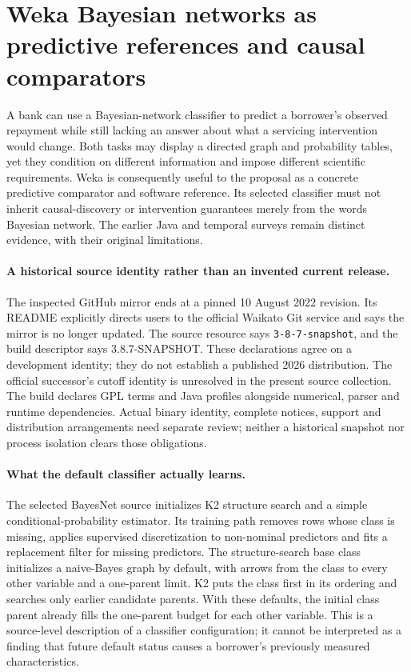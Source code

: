 \section{Weka Bayesian networks as predictive references and causal comparators}
\label{sec:exec24-weka-reuse}

A bank can use a Bayesian-network classifier to predict a borrower's observed
repayment while still lacking an answer about what a servicing intervention
would change. Both tasks may display a directed graph and probability tables,
yet they condition on different information and impose different scientific
requirements. Weka is consequently useful to the proposal as a concrete
predictive comparator and software reference. Its selected classifier must not
inherit causal-discovery or intervention guarantees merely from the words
Bayesian network. The earlier Java and temporal surveys remain distinct
evidence, with their original limitations.\citep{exec13_java_weka,exec15_javatemporal_weka,exec24_weka_source}

\paragraph{A historical source identity rather than an invented current release.}
The inspected GitHub mirror ends at a pinned 10 August 2022 revision. Its
README explicitly directs users to the official Waikato Git service and says
the mirror is no longer updated. The source resource says
\texttt{3-8-7-snapshot}, and the build descriptor says 3.8.7-SNAPSHOT. These
declarations agree on a development identity; they do not establish a published
2026 distribution. The official successor's cutoff identity is unresolved in
the present source collection. The build declares GPL terms and Java profiles
alongside numerical, parser and runtime dependencies. Actual binary identity,
complete notices, support and distribution arrangements need separate review;
neither a historical snapshot nor process isolation clears those obligations.
\citep{exec24_weka_source}

\paragraph{What the default classifier actually learns.}
The selected BayesNet source initializes K2 structure search and a simple
conditional-probability estimator. Its training path removes rows whose class
is missing, applies supervised discretization to non-nominal predictors and
fits a replacement filter for missing predictors. The structure-search base
class initializes a naive-Bayes graph by default, with arrows from the class
to every other variable and a one-parent limit. K2 puts the class first in
its ordering and searches only earlier candidate parents. With these defaults,
the initial class parent already fills the one-parent budget for each other
variable. This is a source-level description of a classifier configuration;
it cannot be interpreted as a finding that future default status causes a
borrower's previously measured characteristics.\citep{exec24_weka_source}

